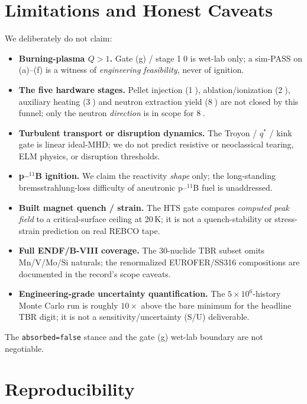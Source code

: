 \documentclass[11pt,a4paper]{article}
\begin{document}
\section{Limitations and Honest Caveats}
\label{sec:limits}

We deliberately do not claim:
\begin{itemize}\itemsep0.2em
\item \textbf{Burning-plasma $Q\!>\!1$.} Gate (g) / stage
\textcircled{\scriptsize 10} is wet-lab only; a sim-PASS on (a)--(f)
is a witness of \emph{engineering feasibility}, never of ignition.
\item \textbf{The five hardware stages.} Pellet injection
(\textcircled{\scriptsize 1}), ablation/ionization
(\textcircled{\scriptsize 2}), auxiliary heating
(\textcircled{\scriptsize 3}) and neutron extraction yield
(\textcircled{\scriptsize 8}) are not closed by this funnel; only the
neutron \emph{direction} is in scope for \textcircled{\scriptsize 8}.
\item \textbf{Turbulent transport or disruption dynamics.} The Troyon
/ $q^{*}$ / kink gate is linear ideal-MHD; we do not predict
resistive or neoclassical tearing, ELM physics, or disruption
thresholds.
\item \textbf{p--$^{11}$B ignition.} We claim the reactivity
\emph{shape} only; the long-standing bremsstrahlung-loss difficulty
of aneutronic p--$^{11}$B fuel is unaddressed.
\item \textbf{Built magnet quench / strain.} The HTS gate compares
\emph{computed peak field} to a critical-surface ceiling at 20\,K; it
is not a quench-stability or stress-strain prediction on real REBCO
tape.
\item \textbf{Full ENDF/B-VIII coverage.} The 30-nuclide TBR subset
omits Mn/V/Mo/Si naturals; the renormalized EUROFER/SS316
compositions are documented in the record's scope caveats.
\item \textbf{Engineering-grade uncertainty quantification.} The
$5\!\times\!10^{6}$-history Monte Carlo run is roughly $10\!\times$
above the bare minimum for the headline TBR digit; it is not a
sensitivity/uncertainty (S/U) deliverable.
\end{itemize}

\noindent
The \texttt{absorbed=false} stance and the gate (g) wet-lab boundary
are not negotiable.

\section{Reproducibility}
\label{sec:repro}
\end{document}
